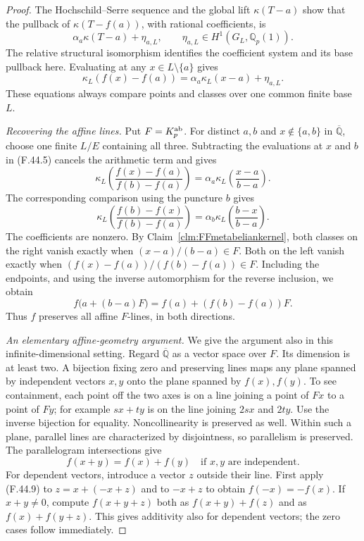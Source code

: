 \documentclass[11pt]{article}
\begin{document}
\begin{proof}
The Hochschild--Serre sequence and
the global lift \(\kappa(T-a)\)
show that the pullback of
\(\kappa(T-f(a))\), with rational
coefficients, is
\[
                         \alpha_a\kappa(T-a)+\eta_{a,L},
           \qquad \eta_{a,L}\in H^1(G_L,\mathbb Q_p(1)).
                                                        \tag{F.44.4}
\]
The relative structural isomorphism
identifies the coefficient system
and its base pullback here. Evaluating
at any \(x\in L\setminus\{a\}\)
gives
\[
       \kappa_L(f(x)-f(a))
          =\alpha_a\kappa_L(x-a)+\eta_{a,L}.
                                                        \tag{F.44.5}
\]
These equations always compare points
and classes over one common finite
base \(L\).

\emph{Recovering the affine lines.}
Put \(F=K_p^{\rm ab}\). For distinct
\(a,b\) and \(x\notin\{a,b\}\)
in \(\overline{\mathbb Q}\), choose
one finite \(L/E\) containing all
three. Subtracting the evaluations
at \(x\) and \(b\) in (F.44.5)
cancels the arithmetic term and gives
\[
 \kappa_L\!\left(\frac{f(x)-f(a)}{f(b)-f(a)}\right)
     =\alpha_a
          \kappa_L\!\left(\frac{x-a}{b-a}\right).
                                                        \tag{F.44.6}
\]
The corresponding comparison using
the puncture \(b\) gives
\[
 \kappa_L\!\left(\frac{f(b)-f(x)}{f(b)-f(a)}\right)
     =\alpha_b
          \kappa_L\!\left(\frac{b-x}{b-a}\right).
                                                        \tag{F.44.7}
\]
The coefficients are nonzero. By
Claim~\ref{clm:FFmetabeliankernel},
both classes on the right vanish
exactly when \((x-a)/(b-a)\in F\).
Both on the left vanish exactly
when \((f(x)-f(a))/(f(b)-f(a))\in F\).
Including the endpoints, and using
the inverse automorphism for the
reverse inclusion, we obtain
\[
                 f\bigl(a+(b-a)F\bigr)
                     =f(a)+(f(b)-f(a))F.
                                                        \tag{F.44.8}
\]
Thus \(f\) preserves all affine
\(F\)-lines, in both directions.

\emph{An elementary affine-geometry argument.}
We give the argument also in this
infinite-dimensional setting. Regard
\(\overline{\mathbb Q}\) as a vector
space over \(F\). Its dimension
is at least two. A bijection fixing
zero and preserving lines maps any
plane spanned by independent vectors
\(x,y\) onto the plane spanned by
\(f(x),f(y)\). To see containment,
each point off the two axes is on
a line joining a point of \(Fx\)
to a point of \(Fy\); for example
\(sx+ty\) is on the line joining
\(2sx\) and \(2ty\). Use the
inverse bijection for equality.
Noncollinearity is preserved as well.
Within such a plane, parallel lines
are characterized by disjointness,
so parallelism is preserved.
The parallelogram intersections give
\[
                      f(x+y)=f(x)+f(y)
                   \quad\text{if }x,y\text{ are independent.}
                                                        \tag{F.44.9}
\]
For dependent vectors, introduce a
vector \(z\) outside their line.
First apply (F.44.9) to
\(z=x+(-x+z)\) and to \(-x+z\)
to obtain \(f(-x)=-f(x)\).
If \(x+y\ne0\), compute
\(f(x+y+z)\) both as
\(f(x+y)+f(z)\) and as
\(f(x)+f(y+z)\). This gives
additivity also for dependent vectors;
the zero cases follow immediately.


\end{proof}
\end{document}
